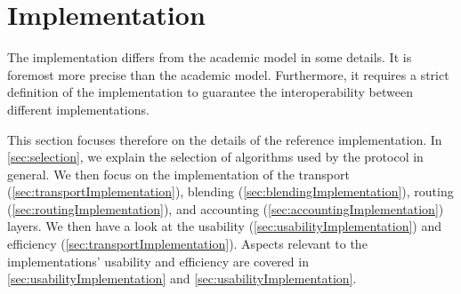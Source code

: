 
\part{Implementation}\label{sec:implementation}
The implementation differs from the academic model in some details. It is foremost more precise than the academic model. Furthermore, it requires a strict definition of the implementation to guarantee the interoperability between different implementations.

This section focuses therefore on the details of the reference implementation. In \cref{sec:selection}, we explain the selection of algorithms used by the protocol in general. We then focus on the implementation of the transport (\cref{sec:transportImplementation}), blending (\cref{sec:blendingImplementation}), routing (\cref{sec:routingImplementation}), and accounting (\cref{sec:accountingImplementation}) layers. We then have a look at the usability (\cref{sec:usabilityImplementation}) and efficiency (\cref{sec:transportImplementation}). Aspects relevant to the implementations' usability and efficiency are covered in \cref{sec:usabilityImplementation} and \cref{sec:usabilityImplementation}.


